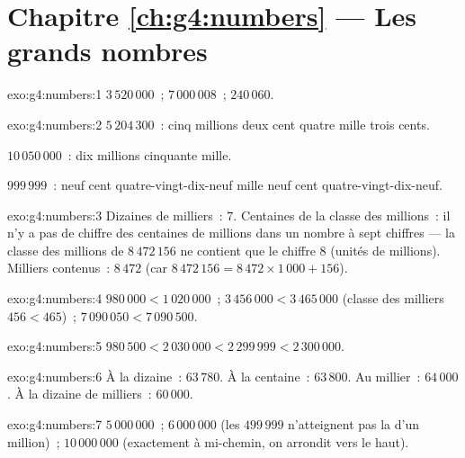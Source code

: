 \section*{Chapitre \ref{ch:g4:numbers} --- Les grands nombres}

\begin{solution}{exo:g4:numbers:1}
$3\,520\,000$~; \quad $7\,000\,008$~; \quad $240\,060$.
\end{solution}

\begin{solution}{exo:g4:numbers:2}
$5\,204\,300$~: cinq millions deux cent quatre mille trois cents.

$10\,050\,000$~: dix millions cinquante mille.

$999\,999$~: neuf cent quatre-vingt-dix-neuf mille neuf cent
quatre-vingt-dix-neuf.
\end{solution}

\begin{solution}{exo:g4:numbers:3}
Dizaines de milliers~: $7$. Centaines de la classe des millions~: il
n'y a pas de chiffre des centaines de millions dans un nombre à
sept chiffres --- la classe des millions de $8\,472\,156$ ne
contient que le chiffre $8$ (unités de millions). Milliers
contenus~: $8\,472$ (car
$8\,472\,156 = 8\,472 \times 1\,000 + 156$).
\end{solution}

\begin{solution}{exo:g4:numbers:4}
$980\,000 < 1\,020\,000$~; \quad
$3\,456\,000 < 3\,465\,000$ (classe des milliers $456 < 465$)~; \quad
$7\,090\,050 < 7\,090\,500$.
\end{solution}

\begin{solution}{exo:g4:numbers:5}
$980\,500 < 2\,030\,000 < 2\,299\,999 < 2\,300\,000$.
\end{solution}

\begin{solution}{exo:g4:numbers:6}
À la dizaine~: $63\,780$. À la centaine~: $63\,800$. Au millier~:
$64\,000$. À la dizaine de milliers~: $60\,000$.
\end{solution}

\begin{solution}{exo:g4:numbers:7}
$5\,000\,000$~; \quad $6\,000\,000$ (les $499\,999$ n'atteignent pas
la  d'un million)~; \quad $10\,000\,000$ (exactement à
mi-chemin, on arrondit vers le haut).
\end{solution}


